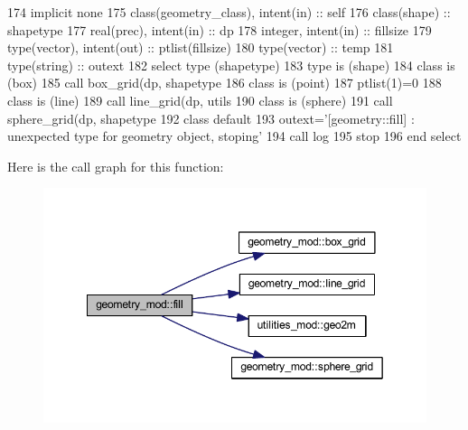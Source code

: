 \begin{DoxyCode}
174     \textcolor{keywordtype}{implicit none}
175     \textcolor{keywordtype}{class}(geometry\_class), \textcolor{keywordtype}{intent(in)} :: self
176     \textcolor{keywordtype}{class}(shape) :: shapetype
177     \textcolor{keywordtype}{real(prec)}, \textcolor{keywordtype}{intent(in)} :: dp
178     \textcolor{keywordtype}{integer}, \textcolor{keywordtype}{intent(in)} :: fillsize
179     \textcolor{keywordtype}{type}(vector), \textcolor{keywordtype}{intent(out)} :: ptlist(fillsize)
180     \textcolor{keywordtype}{type}(vector) :: temp
181     \textcolor{keywordtype}{type}(string) :: outext
182     \textcolor{keywordflow}{select type} (shapetype)
183 \textcolor{keywordflow}{    type is} (shape)
184 \textcolor{keywordflow}{    class is} (box)
185         \textcolor{keyword}{call }box\_grid(dp, shapetype%
186 \textcolor{keywordflow}{    class is} (point)
187         ptlist(1)=0
188 \textcolor{keywordflow}{    class is} (line)
189         \textcolor{keyword}{call }line\_grid(dp, utils%
190 \textcolor{keywordflow}{    class is} (sphere)
191         \textcolor{keyword}{call }sphere\_grid(dp, shapetype%
192 \textcolor{keywordflow}{        class default}
193         outext=\textcolor{stringliteral}{'[geometry::fill] : unexpected type for geometry object, stoping'}
194         \textcolor{keyword}{call }log%
195         stop
196 \textcolor{keywordflow}{    end select}
\end{DoxyCode}
Here is the call graph for this function\+:\nopagebreak
\begin{figure}[H]
\begin{center}
\leavevmode
\includegraphics[width=349pt]{namespacegeometry__mod_a1d97564e04562532b5389bfb91aa676b_cgraph}
\end{center}
\end{figure}
\mbox{\label{namespacegeometry__mod_ad790edd694561b33dad20cfa3a14e8f2}} 
